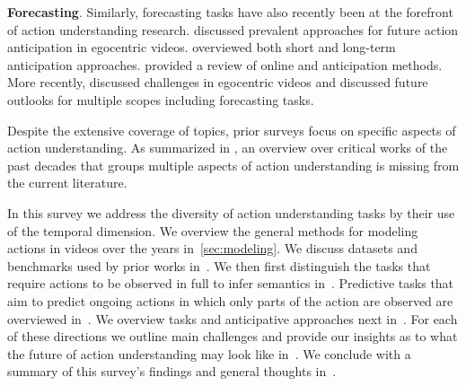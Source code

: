 \documentclass[smallextended,twocolumn,natbib]{svjour3}
\begin{document}
\noindent
\textbf{Forecasting}. Similarly, forecasting tasks have also recently been at the forefront of action understanding research. \citet{rodin2021predicting} discussed prevalent approaches for future action anticipation in egocentric videos. \citet{zhong2023survey} overviewed both short and long-term anticipation approaches. \citet{hu2022online} provided a review of online and anticipation methods. More recently, \citet{plizzari2024outlook} discussed challenges in egocentric videos and discussed future outlooks for multiple scopes including forecasting tasks.


  
Despite the extensive coverage of topics, prior surveys focus on specific aspects of action understanding. As summarized in , an overview over critical works of the past decades that groups multiple aspects of action understanding is missing from the current literature. 


In this survey we address the diversity of action understanding tasks by their use of the temporal dimension. We overview the general methods for modeling actions in videos over the years in~\ref{sec:modeling}. We discuss datasets and benchmarks used by prior works in~. We then first distinguish the tasks that require actions to be observed in full to infer semantics in~.  Predictive tasks that aim to predict ongoing actions in which only parts of the action are observed are overviewed in~. We overview tasks and anticipative approaches next in~. For each of these directions we outline main challenges and provide our insights as to what the future of action understanding may look like in~. We conclude with a summary of this survey's findings and general thoughts in~.
\end{document}
